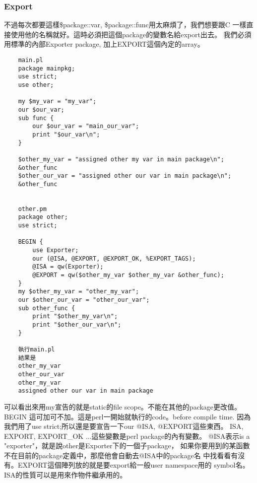     \subsubsection{Export}
    不過每次都要這樣\$package::var, \$package::func用太麻煩了，我們想要跟C
    一樣直接使用他的名稱就好。這時必須把這個package的變數名給export出去。
    我們必須用標準的內部Exporter package, 加上EXPORT這個內定的array。
    \begin{verbatim}
    main.pl
    package mainpkg;
    use strict;
    use other;

    my $my_var = "my_var";
    our $our_var;
    sub func {
        our $our_var = "main_our_var";
        print "$our_var\n";
    }

    $other_my_var = "assigned other my var in main package\n";
    &other_func
    $other_our_var = "assigned other our var in main package\n";
    &other_func


    other.pm
    package other;
    use strict;

    BEGIN {
        use Exporter;
        our (@ISA, @EXPORT, @EXPORT_OK, %EXPORT_TAGS);
        @ISA = qw(Exporter);
        @EXPORT = qw($other_my_var $other_my_var &other_func);
    }
    my $other_my_var = "other_my_var";
    our $other_our_var = "other_our_var";
    sub other_func {
        print "$other_my_var\n";
        print "$other_our_var\n";
    }

    執行main.pl
    結果是
    other_my_var
    other_our_var
    other_my_var
    assigned other our var in main package
    \end{verbatim}
    可以看出來用my宣告的就是static的file scope。不能在其他的package更改值。
    BEGIN {}這可加可不加。這是perl一開始就執行的code。before compile time.
    因為我們用了use strict;所以還是要宣告一下our @ISA, @EXPORT這些東西。
    ISA, EXPORT, EXPORT\_OK ...這些變數是perl package的內有變數。
    @ISA表示is a "exporter"，就是說other是Exporter下的一個子package，
    如果你要用到的某函數不在目前的package定義中，那麼他會自動去@ISA中的package名
    中找看看有沒有。EXPORT這個陣列放的就是要export給一般user namespace用的
    symbol名。ISA的性質可以是用來作物件繼承用的。

